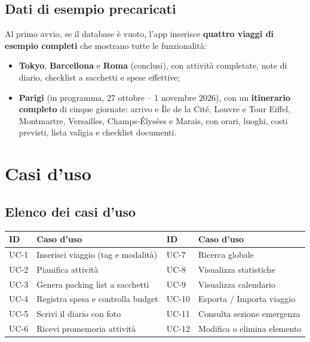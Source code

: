 \documentclass[11pt, a4paper]{article}
\begin{document}
\subsection{Dati di esempio precaricati}
Al primo avvio, se il database è vuoto, l'app inserisce \textbf{quattro viaggi di
esempio completi} che mostrano tutte le funzionalità:
\begin{itemize}[noitemsep]
    \item \textbf{Tokyo}, \textbf{Barcellona} e \textbf{Roma} (conclusi), con
    attività completate, note di diario, checklist a sacchetti e spese effettive;
    \item \textbf{Parigi} (in programma, 27 ottobre -- 1 novembre 2026), con un
    \textbf{itinerario completo} di cinque giornate: arrivo e Île de la Cité,
    Louvre e Tour Eiffel, Montmartre, Versailles, Champs-Élysées e Marais, con
    orari, luoghi, costi previsti, lista valigia e checklist documenti.
\end{itemize}

\section{Casi d'uso}

\subsection{Elenco dei casi d'uso}
\begin{table}[h!]
    \centering
    \renewcommand{\arraystretch}{1.3}
    \begin{tabularx}{\textwidth}{l X | l X}
        \toprule
        \textbf{ID} & \textbf{Caso d'uso} & \textbf{ID} & \textbf{Caso d'uso} \\
        \midrule
        UC-1 & Inserisci viaggio (tag e modalità) & UC-7 & Ricerca globale \\
        UC-2 & Pianifica attività & UC-8 & Visualizza statistiche \\
        UC-3 & Genera packing list a sacchetti & UC-9 & Visualizza calendario \\
        UC-4 & Registra spesa e controlla budget & UC-10 & Esporta / Importa viaggio \\
        UC-5 & Scrivi il diario con foto & UC-11 & Consulta sezione emergenza \\
        UC-6 & Ricevi promemoria attività & UC-12 & Modifica o elimina elemento \\
        \bottomrule
    \end{tabularx}
\end{table}
\end{document}
